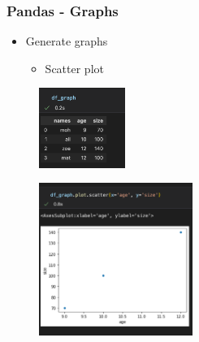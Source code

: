 \begin{frame}\frametitle{Pandas - Graphs}
   \begin{minipage}{0.58\linewidth}
      \begin{itemize}
         \item Generate graphs
         \begin{itemize}
            \item Scatter plot
         \end{itemize}
      \end{itemize}
      \vspace{.5cm}
      \begin{figure}[H]
         \includegraphics[width=2.8cm]{../images/illustrations/pandas_df_graph.png}
      \end{figure}
   \end{minipage}
   \begin{minipage}{0.38\linewidth}
      \begin{figure}[H]
         \includegraphics[width=5cm]{../images/illustrations/pandas_scatter.png}
      \end{figure}
   \end{minipage}
\end{frame}



